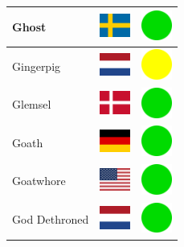 \documentclass[12pt, a4paper, twoside]{report}
\begin{document}
\begin{center}
\begin{longtable}{|p{5cm}|p{2cm}|p{2cm}|}
 Ghost                                                      & \includegraphics[width=1cm]{../img/flags/se} &   \includegraphics[width=1cm]{../likes/y} \\ \hline
 Gingerpig                                                  & \includegraphics[width=1cm]{../img/flags/nl} &   \includegraphics[width=1cm]{../likes/m} \\ \hline
 Glemsel                                                    & \includegraphics[width=1cm]{../img/flags/dk} &   \includegraphics[width=1cm]{../likes/y} \\ \hline
 Goath                                                      & \includegraphics[width=1cm]{../img/flags/de} &   \includegraphics[width=1cm]{../likes/y} \\ \hline
 Goatwhore                                                  & \includegraphics[width=1cm]{../img/flags/us} &   \includegraphics[width=1cm]{../likes/y} \\ \hline
 God Dethroned                                              & \includegraphics[width=1cm]{../img/flags/nl} &   \includegraphics[width=1cm]{../likes/y} \\ \hline

\end{longtable}
\end{center}
\end{document}
